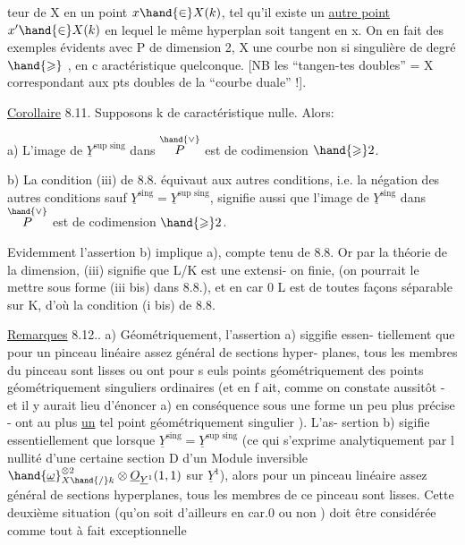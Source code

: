 
teur de X en un point $x\hand{\in} X(k)$,  tel qu'il existe un \uline{autre point}
$x'\hand{\in} X(k)$ en lequel le même hyperplan soit tangent en x. On en fait des
exemples évidents avec  P de dimension 2, X une courbe non si
singulière de degré $\hand{\geqslant}$  , en c aractéristique quelconque. [NB les ``tangen-tes doubles'' = X correspondant aux pts doubles de la ``courbe duale'' !].

\uline{Corollaire} 8.11. Supposons k de caractéristique nulle. Alors:

a) L'image de $\underline{Y}^{\text{sup sing}}$ dans $\overset{\hand{\vee}}{P}$ est de codimension $\hand{\geqslant} 2$.

b) La condition (iii) de 8.8. équivaut aux autres conditions, i.e.
la négation des autres conditions\hand{,} sauf $\underline{Y}^{\text{sing}}=\underline{Y}^{\text{sup sing}}$, signifie aussi que l'image de $\underline{Y}^{\text{sing}}$
dans $\overset{\hand{\vee}}{P}$ est de codimension $\hand{\geqslant} 2$.

Evidemment l'assertion b) implique a), compte tenu de 8.8. Or
par la théorie de la dimension, (iii) signifie que L/K est une extensi-%
on finie,  (on pourrait le mettre sous forme (iii bis) dans 8.8.),
et en car 0  L est de toutes façons séparable sur K, d'où
la condition (i bis) de 8.8.

\uline{Remarques} 8.12.. a) Géométriquement, l'assertion a) siggifie essen-%
tiellement que pour un pinceau linéaire assez général de sections hyper-%
planes, tous les membres du pinceau sont lisses ou ont 
 pour s euls points géométriquement des points géométriquement
singuliers ordinaires (et en f ait, comme on constate aussitôt - et il
y aurait lieu d'énoncer a) en conséquence sous une forme un peu plus
précise - ont au plus \uline{un} tel point géométriquement singulier ). L'as-%
sertion b) sigifie essentiellement que lorsque $\underline{Y}^{\text{sing}}=\underline{Y}^{\text{sup sing}}$ (ce qui s'exprime
analytiquement par l nullité d'une certaine section D d'un Module
inversible $\hand{\underline{\omega}}^{\otimes 2}_{X\hand{/}k}\otimes\underline{O}_{\underline{Y}^1}(1,1)$ sur $\underline{Y}^1$), alors pour un pinceau linéaire
assez général de sections hyperplanes, tous les membres de ce 
pinceau sont lisses. Cette deuxième situation (qu'on soit d'ailleurs
en car.0 ou non ) doit être considérée comme tout à fait exceptionnelle

